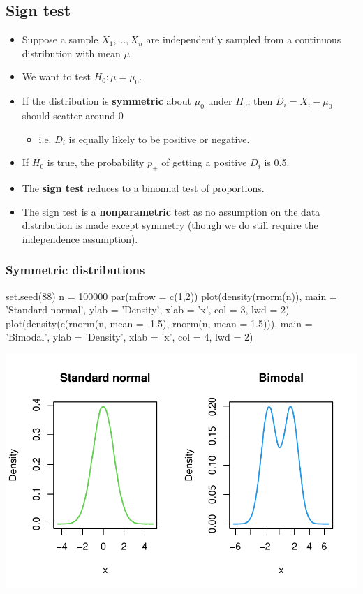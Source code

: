 \documentclass[a4paper]{article}
\begin{document}
\subsection{Sign test}
\begin{itemize}
	\item Suppose a sample \( X_1,\dotsc,X_n \) are independently sampled from a continuous distribution with mean \( \mu \).
	\item We want to test \( H_0: \mu = \mu_0 \).
	\item If the distribution is \textcolor{myred}{\textbf{symmetric}} about \( \mu_0 \) under \( H_0 \), then \( D_i = X_i - \mu_0 \) should scatter around 0
	\begin{itemize}
		\item i.e. \( D_i \) is equally likely to be positive or negative.
	\end{itemize}
	\item If \( H_0 \) is true, the probability \( p_{+} \) of getting a positive \( D_i \) is 0.5.
	\item The \textcolor{myred}{\textbf{sign test}} reduces to a binomial test of proportions.
	\item The sign test is a \textcolor{myred}{\textbf{nonparametric}} test as no assumption on the data distribution is made except symmetry (though we do still require the independence assumption).
\end{itemize}
\subsubsection{Symmetric distributions}
\begin{Schunk}
\begin{Sinput}
set.seed(88)
n = 100000
par(mfrow = c(1,2))
plot(density(rnorm(n)),
     main = 'Standard normal', ylab = 'Density', xlab = 'x', col = 3, lwd = 2)
plot(density(c(rnorm(n, mean = -1.5), rnorm(n, mean = 1.5))),
     main = 'Bimodal', ylab = 'Density', xlab = 'x', col = 4, lwd = 2)
\end{Sinput}


{\centering \includegraphics[width=\maxwidth]{figure/listings-unnamed-chunk-109-1} 

}

\end{Schunk}
\end{document}
